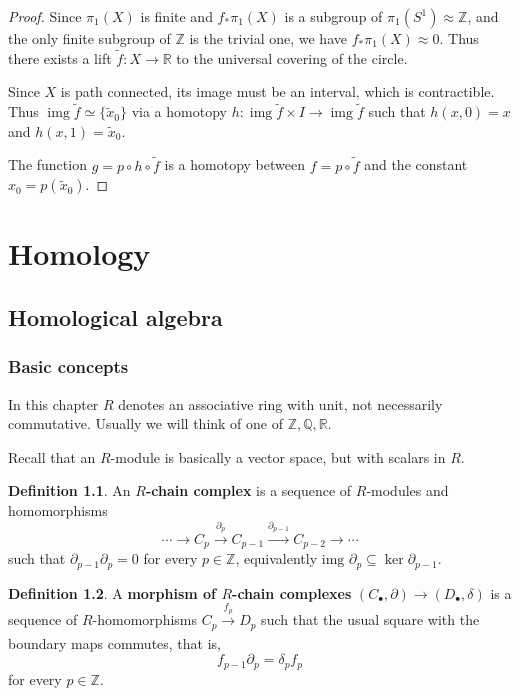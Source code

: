 \documentclass{book}
\theoremstyle{definition}
\newtheorem*{defn}{Definition}
\newcommand{\R}{\mathbb{R}}
\newcommand{\Z}{\mathbb{Z}}
\newcommand{\Q}{\mathbb{Q}}
\DeclareMathOperator{\img}{img}
\begin{document}
\begin{proof}
Since $\pi_1(X)$ is finite and $f_*\pi_1(X)$ is a subgroup of
$\pi_1(S^1)\approx\Z$, and the only finite subgroup of $\Z$
is the trivial one, we have $f_*\pi_1(X)\approx0$. Thus there
exists a lift $\tilde f:X\to\R$ to the universal covering of
the circle.

Since $X$ is path connected, its image must be an interval,
which is contractible. Thus
$\img\tilde f\simeq\{\tilde x_0\}$ via a homotopy
$h:\img\tilde f\times I\to\img\tilde f$ such that
$h(x,0)=x$ and $h(x,1)=\tilde x_0$.

The function $g=p\circ h\circ\tilde f$ is a homotopy between
$f=p\circ\tilde f$ and the constant $x_0=p(\tilde x_0)$.
\end{proof}

\part{Homology}

\chapter{Homological algebra}

\section{Basic concepts}

In this chapter $R$ denotes an associative ring with unit,
not necessarily commutative. Usually we will think of one of
$\Z,\Q,\R$.

Recall that an $R$-module is basically a vector space, but
with scalars in $R$.

\begin{defn}
An \textbf{$R$-chain complex} is a sequence of $R$-modules
and homomorphisms
$$
\cdots \to C_p \xrightarrow{\partial_p} C_{p-1}
\xrightarrow{\partial_{p-1}} C_{p-2}\to\cdots
$$
such that $\partial_{p-1}\partial_p=0$ for every
$p\in\mathbb Z$, equivalently
$\text{img }\partial_p\subseteq\ker\partial_{p-1}$.
\end{defn}

\begin{defn}
A \textbf{morphism of $R$-chain complexes}
$(C_\bullet,\partial)\to(D_\bullet,\delta)$ is a sequence of
$R$-homomorphisms $C_p\xrightarrow[]{f_p}D_p$ such that the
usual square with the boundary maps commutes, that is,
$$
f_{p-1}\partial_p=\delta_pf_p
$$
for every $p\in\mathbb Z$.
\end{defn}
\end{document}
